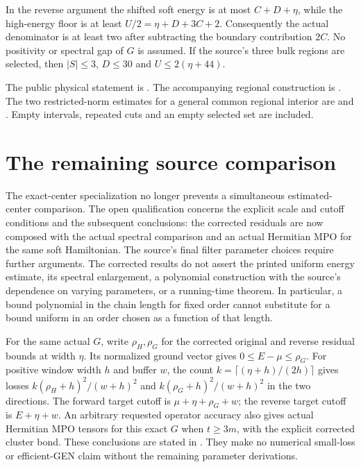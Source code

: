 \documentclass{article}
\begin{document}
In the reverse argument the shifted soft energy is at most $C+D+\eta$,
while the high-energy floor is at least $U/2=\eta+D+3C+2$.
Consequently the actual denominator is at least two after subtracting
the boundary contribution $2C$. No positivity or spectral gap of $G$
is assumed. If the source's three bulk regions are selected, then
$|S|\leq3$, $D\leq30$ and $U\leq2(\eta+44)$.

The public physical statement is
.
The accompanying regional construction is
.
The two restricted-norm estimates for a general common regional
interior are
and
.
Empty intervals, repeated cuts and an empty selected set are included.

\section{The remaining source comparison}

The exact-center specialization no longer prevents a simultaneous
estimated-center comparison. The open qualification concerns the
explicit scale and cutoff conditions and the subsequent conclusions:
the corrected residuals are now composed with the actual spectral
comparison and an actual Hermitian MPO for the same soft Hamiltonian.
The source's final filter parameter choices require further arguments.
The corrected results do not assert the printed
uniform energy estimate, its spectral enlargement, a polynomial
construction with the source's dependence on varying parameters, or a
running-time theorem. In particular, a bound polynomial in the chain
length for fixed order cannot substitute for a bound uniform in an
order chosen as a function of that length.

For the same actual $G$, write $\rho_H,\rho_G$ for the corrected
original and reverse residual bounds at width $\eta$. Its normalized
ground vector gives $0\leq E-\mu\leq\rho_G$. For positive window width
$h$ and buffer $w$, the count $k=\lceil(\eta+h)/(2h)\rceil$ gives losses
$k(\rho_H+h)^2/(w+h)^2$ and $k(\rho_G+h)^2/(w+h)^2$ in the two
directions. The forward target cutoff is $\mu+\eta+\rho_G+w$; the
reverse target cutoff is $E+\eta+w$. An arbitrary requested operator
accuracy also gives actual Hermitian MPO tensors for this exact $G$
when $t\geq3m$, with the explicit corrected cluster bond. These
conclusions are stated in
.
They make no numerical small-loss or efficient-GEN claim without the
remaining parameter derivations.
\end{document}
